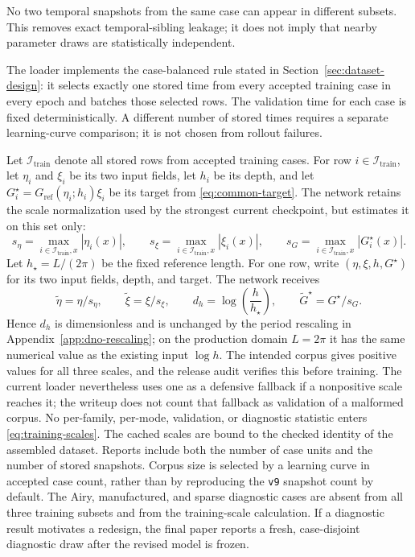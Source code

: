 \documentclass[11pt]{article}
\begin{document}
No two temporal snapshots from the same case can appear in different
subsets.  This removes exact temporal-sibling leakage; it does not imply that
nearby parameter draws are statistically independent.

The loader implements the case-balanced rule stated in
Section~\ref{sec:dataset-design}: it selects exactly one stored time from
every accepted training case in every epoch and batches those selected rows.
The validation time for each case is fixed deterministically.  A different
number of stored times requires a separate learning-curve comparison; it is
not chosen from rollout failures.

Let $\mathcal I_{\mathrm{train}}$ denote all stored rows from accepted
training cases.  For row $i\in\mathcal I_{\mathrm{train}}$, let $\eta_i$ and
$\xi_i$ be its two input fields, let $h_i$ be its depth, and let
$G_i^\star=G_{\mathrm{ref}}(\eta_i;h_i)\xi_i$ be its target from
\eqref{eq:common-target}.  The network retains the scale normalization used by
the strongest current checkpoint, but estimates it on this set only:
\begin{equation}
  s_\eta=\max_{i\in\mathcal I_{\mathrm{train}},x}|\eta_i(x)|,
  \qquad
  s_\xi=\max_{i\in\mathcal I_{\mathrm{train}},x}|\xi_i(x)|,
  \qquad
  s_G=\max_{i\in\mathcal I_{\mathrm{train}},x}|G_i^\star(x)|.
  \label{eq:training-scales}
\end{equation}
Let $h_\star=L/(2\pi)$ be the fixed reference length.  For one row, write
$(\eta,\xi,h,G^\star)$ for its two input fields, depth, and target.  The
network receives
\begin{equation}
  \widetilde\eta=\eta/s_\eta,\qquad
  \widetilde\xi=\xi/s_\xi,\qquad
  d_h=\log\!\left(\frac{h}{h_\star}\right),\qquad
  \widetilde G^\star=G^\star/s_G.
  \label{eq:network-normalization}
\end{equation}
Hence $d_h$ is
dimensionless and is unchanged by the period rescaling in
Appendix~\ref{app:dno-rescaling}; on the production domain $L=2\pi$ it has
the same numerical value as the existing input $\log h$.
The intended corpus gives positive values for all three scales, and the
release audit verifies this before training.  The current loader nevertheless
uses one as a defensive fallback if a nonpositive scale reaches it; the
writeup does not count that fallback as validation of a malformed corpus.
No per-family, per-mode, validation, or diagnostic statistic enters
\eqref{eq:training-scales}.  The cached scales are bound to the checked
identity of the assembled dataset.
Reports include both the number of case units and the number of stored
snapshots.  Corpus size is selected by a learning curve in accepted case
count, rather than by reproducing the \texttt{v9} snapshot count by default.
The Airy, manufactured, and sparse diagnostic cases are absent from all three
training subsets and from the training-scale calculation.  If a diagnostic
result motivates a redesign, the final paper reports a fresh, case-disjoint
diagnostic draw after the revised model is frozen.
\end{document}
